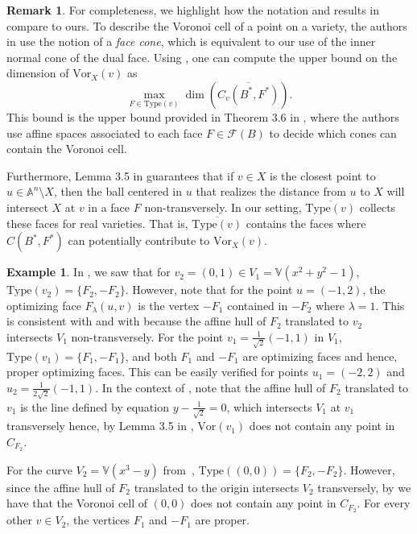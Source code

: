 \documentclass{article}
\numberwithin{theorem}{section}
\theoremstyle{definition}
\newtheorem{remark}[theorem]{Remark}
\newtheorem{example}[theorem]{Example}
\theoremstyle{example_contd}
\newcommand{\vor}{\mathrm{Vor}}
\newcommand{\F}{\mathcal{F}}
\newcommand{\type}{\mathrm{Type}}
\renewcommand{\l}{\lambda}
\newcommand{\V}{{\mathbb{V}}}
\begin{document}
\begin{remark}\label{rem:conedim}
	 For completeness, we highlight how the notation and results in \cite{BECEDAS2024102229} compare to ours. 
    To describe the Voronoi cell of a point on a variety, the authors in \cite{BECEDAS2024102229} use the notion of a \textit{face cone}, which is equivalent to our use of the inner normal cone of the dual face.
    Using , one can compute the upper bound on the dimension of $\vor_X(v)$ as
    \begin{equation}
    	\max_{F\in \type(v)}\dim(\overline{C_v(B^*,F^*)}) .
    \end{equation}
    This bound is the upper bound provided in Theorem 3.6 in \cite{BECEDAS2024102229}, where the authors use affine spaces associated to each face $F\in \F(B)$ to decide which cones can contain the Voronoi cell. 

    Furthermore, Lemma 3.5 in \cite{BECEDAS2024102229} guarantees that if $v\in X$ is the closest point to $u\in \mathbb{A}^n \setminus X$, then the ball centered in $u$ that realizes the distance from $u$ to $X$ will intersect $X$ at $v$ in a face $F$ non-transversely. In our setting, $\overline{\type(v)}$ collects these faces for real varieties. That is, $\overline{\type(v)}$ contains the faces where $C(B^*,F^*)$ can potentially contribute to $\vor_X(v).$

\end{remark}



\begin{example}\label{ex:optimizing face and types}
	In , we saw that for $v_2=(0,1)\in V_1 = \V(x^2 + y^2 -1)$, $\type(v_2)=\{F_2,-F_2\}$. 
	However, note that for the point $u=(-1,2)$, the optimizing face $F_\l(u,v)$ is the vertex $-F_1$ contained in $-F_2$ where $\l=1$. This is consistent with  and with \cite[Lemma 3.5]{BECEDAS2024102229} because the affine hull of $F_2$ translated to $v_2$ intersects $V_1$ non-transversely.
	For the point $v_1=\frac{1}{\sqrt{2}}(-1,1)$ in $V_1$, $\type(v_1)=\{F_1,-F_1\}$, and both $F_1$ and $-F_1$ are optimizing faces and hence, proper optimizing faces. This can be easily verified for points $u_1=(-2,2)$ and $u_2=\frac{1}{2\sqrt{2}}(-1,1).$ In the context of , note that the affine hull of $F_2$ translated to $v_1$ is the line defined by equation $y-\frac{1}{\sqrt{2}}=0$, which intersects $V_1$ at $v_1$ transversely hence, by Lemma 3.5 in \cite{BECEDAS2024102229}, $\vor(v_1)$ does not contain any point in $C_{F_2}.$

	For the curve $V_2 = \V(x^3 - y)$  from~, $\type((0,0))=\{F_2,-F_2\}$. However, since the affine hull of $F_2$ translated to the origin intersects $V_2$ transversely, by \cite{BECEDAS2024102229} we have that the Voronoi cell of $(0,0)$ does not contain any point in $C_{F_2}$.
    For every other $v \in V_2$, the vertices $F_1$ and $-F_1$ are proper. 
\end{example}
\end{document}
